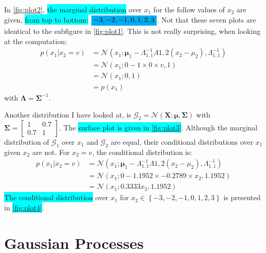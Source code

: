 \documentclass[a4paper,11pt]{article}
\newcommand{\V}[1]{\ensuremath{\mathbf{#1}}}
\newcommand{\mean}{\ensuremath{\boldsymbol{\mu}}}
\newcommand{\cov}{\ensuremath{\boldsymbol{\Sigma}}}
\newcommand{\npdf}{\ensuremath{\mathcal{N}}}
\newcommand{\hl}[1]{\colorbox{cyan}{#1}}
\newcommand{\mhl}[1]{\mathchoice%
  {\colorbox{cyan}{$\displaystyle#1$}}%
  {\colorbox{cyan}{$\textstyle#1$}}%
  {\colorbox{cyan}{$\scriptstyle#1$}}%
  {\colorbox{cyan}{$\scriptscriptstyle#1$}}}
\begin{document}
  In \autoref{fig:plot2}, \hl{the marginal distribution} over $x_1$ for the follow values of $x_2$ are given, \hl{from top to bottom:} $\mhl{-3, -2, -1, 0, 1, 2, 3}$.  Not that these seven plots are identical to the subfigure in \autoref{fig:plot1}.  This is not really surprising, when looking at the computation:
  \begin{align*}
    p(x_1 | x_2 = v) 
    &= \npdf(x_1; \mean_1 - \Lambda_{1,1}^{-1} \Lambda{1,2} (x_2 - \mu_2), \Lambda_{1,1}^{-1}) \\
    &= \npdf(x_1; 0 - 1  \times 0 \times v, 1) \\
    &= \npdf(x_1; 0, 1) \\
    &= p(x_1)
  \end{align*}
  with $\V{\Lambda} = \cov^{-1}$.

  Another distribution I have looked at, is $\mathcal G_2 = \npdf(\V{X}; \mean, \cov)$ with $\cov = \begin{bmatrix}1 & 0.7 \\ 0.7 & 1\end{bmatrix}$.  The \hl{surface plot is given in \autoref{fig:plot3}}.  Although the marginal distribution of $\mathcal G_1$ over $x_1$ and $\mathcal G_2$ are equal, their conditional distributions over $x_1$ given $x_2$ are not.  For $x_2 = v$, the conditional distribution is:
    \begin{align*}
      p(x_1 | x_2 = v)
      &= \npdf(x_1; \mean_1 - \Lambda_{1,1}^{-1} \Lambda{1,2} (x_2 - \mu_2), \Lambda_{1,1}^{-1}) \\
      &= \npdf(x_1; 0 - 1.1952 \times -0.2789 \times x_2, 1.1952) \\
      &= \npdf(x_1; 0.3333 x_2, 1.1952)
    \end{align*}
\hl{The conditional distribution} over $x_1$ for $x_2 \in \left\{-3, -2, -1, 0, 1, 2, 3\right\}$ is presented in \hl{\autoref{fig:plot4}}.


\section{Gaussian Processes}
\end{document}
